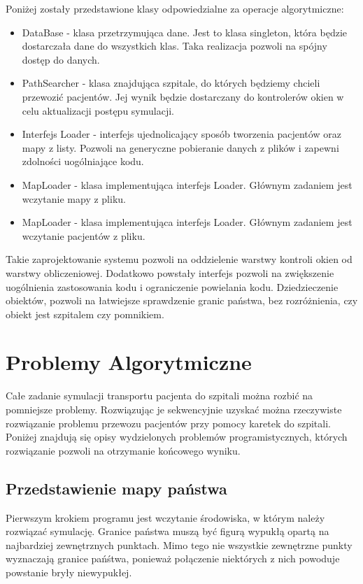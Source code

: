 \documentclass[10pt,a4paper]{article}
\begin{document}
Poniżej zostały przedstawione klasy odpowiedzialne za operacje algorytmiczne:

\begin{itemize}
    \item DataBase - klasa przetrzymująca dane. Jest to klasa singleton, która będzie dostarczała dane do wszystkich klas. Taka realizacja pozwoli na spójny dostęp do danych.
    \item PathSearcher - klasa znajdująca szpitale, do których będziemy chcieli przewozić pacjentów. Jej wynik będzie dostarczany do kontrolerów okien w celu aktualizacji postępu symulacji.
    \item Interfejs Loader - interfejs ujednolicający sposób tworzenia pacjentów oraz mapy z listy. Pozwoli na generyczne pobieranie danych z plików i zapewni zdolności uogólniające kodu.
    \item MapLoader - klasa implementująca interfejs Loader. Głównym zadaniem jest wczytanie mapy z pliku.
    \item MapLoader - klasa implementująca interfejs Loader. Głównym zadaniem jest wczytanie pacjentów z pliku.
\end{itemize}

Takie zaprojektowanie systemu pozwoli na oddzielenie warstwy kontroli okien od warstwy obliczeniowej.
Dodatkowo powstały interfejs pozwoli na zwiększenie uogólnienia zastosowania kodu i ograniczenie powielania kodu.
Dziedzieczenie obiektów, pozwoli na łatwiejsze sprawdzenie granic państwa, bez rozróżnienia, czy obiekt jest szpitalem czy pomnikiem.

\section{Problemy Algorytmiczne}

Całe zadanie symulacji transportu pacjenta do szpitali można rozbić na pomniejsze problemy.
Rozwiązując je sekwencyjnie uzyskać można rzeczywiste rozwiązanie problemu przewozu pacjentów przy pomocy karetek do szpitali.
Poniżej znajdują się opisy wydzielonych problemów programistycznych, których rozwiązanie pozwoli na otrzymanie końcowego wyniku.

\subsection{Przedstawienie mapy państwa}

Pierwszym krokiem programu jest wczytanie środowiska, w którym należy rozwiązać symulację.
Granice państwa muszą być figurą wypukłą opartą na najbardziej zewnętrznych punktach.
Mimo tego nie wszystkie zewnętrzne punkty wyznaczają granice pańśtwa, ponieważ połączenie niektórych z nich powoduje powstanie bryły niewypukłej.
\end{document}
